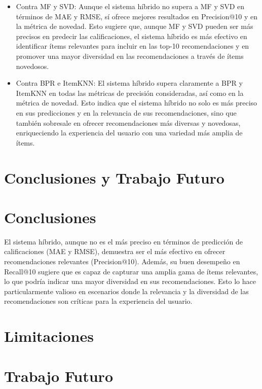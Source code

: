 \documentclass[runningheads]{llncs}
\begin{document}
    \begin{itemize}
        \item Contra MF y SVD: Aunque el sistema híbrido no supera a MF y SVD en términos de MAE y RMSE, sí ofrece mejores resultados en Precision@10 y en la métrica de novedad. Esto sugiere que, aunque MF y SVD pueden ser más precisos en predecir las calificaciones, el sistema híbrido es más efectivo en identificar ítems relevantes para incluir en las top-10 recomendaciones y en promover una mayor diversidad en las recomendaciones a través de ítems novedosos.
        \item Contra BPR e ItemKNN: El sistema híbrido supera claramente a BPR y ItemKNN en todas las métricas de precisión consideradas, así como en la métrica de novedad. Esto indica que el sistema híbrido no solo es más preciso en sus predicciones y en la relevancia de sus recomendaciones, sino que también sobresale en ofrecer recomendaciones más diversas y novedosas, enriqueciendo la experiencia del usuario con una variedad más amplia de ítems.
    \end{itemize}
        
\section{Conclusiones y Trabajo Futuro}
    \section{Conclusiones}

    El sistema híbrido, aunque no es el más preciso en términos de predicción de calificaciones (MAE y RMSE), demuestra ser el más efectivo en ofrecer recomendaciones relevantes (Precision@10). Además, su buen desempeño en Recall@10 sugiere que es capaz de capturar una amplia gama de ítems relevantes, lo que podría indicar una mayor diversidad en sus recomendaciones. Esto lo hace particularmente valioso en escenarios donde la relevancia y la diversidad de las recomendaciones son críticas para la experiencia del usuario.
    \section{Limitaciones}
    \section{Trabajo Futuro}








\end{document}

